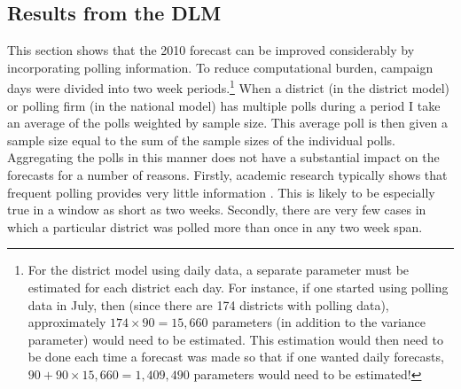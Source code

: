 \documentclass[12pt,final,fleqn]{article}
\theoremstyle{plain}
\begin{document}
\subsection{Results from the DLM} \label{sec: Results from the DLM}
This section shows that the 2010 forecast can be improved considerably by incorporating polling information. To reduce computational burden, campaign days were divided into two week periods.\footnote{For the district model using daily data, a separate parameter must be estimated for each district each day. For instance, if one started using polling data in July, then (since there are 174 districts with polling data), approximately $174 \times 90 =  15,660$ parameters (in addition to the variance parameter) would need to be estimated. This estimation would then need to be done each time a forecast was made so that if one wanted daily forecasts, $90 + 90 \times 15,660 =  1,409,490$ parameters would need to be estimated!} When a district (in the district model) or polling firm (in the national model) has multiple polls during a period I take an average of the polls weighted by sample size. This average poll is then given a sample size equal to the sum of the sample sizes of the individual polls. Aggregating the polls in this manner does not have a substantial impact on the forecasts for a number of reasons. Firstly, academic research typically shows that frequent polling provides very little information \citep[e.g.][]{gelman1993american, lock2010bayesian}. This is likely to be especially true in a window as short as two weeks. Secondly, there are very few cases in which a particular district was polled more than once in any two week span. 
\end{document}
